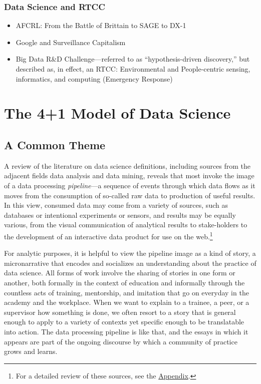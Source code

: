 \documentclass[
  letterpaper,
]{report}
\providecommand{\tightlist}{%
  \setlength{\itemsep}{0pt}\setlength{\parskip}{0pt}}\usepackage{longtable,booktabs,array}
\begin{document}
\hypertarget{data-science-and-rtcc}{%
\section{Data Science and RTCC}\label{data-science-and-rtcc}}

\begin{itemize}
\tightlist
\item
  AFCRL: From the Battle of Brittain to SAGE to DX-1
\item
  Google and Surveillance Capitalism
\item
  Big Data R\&D Challenge---referred to as ``hypothesis-driven
  discovery,'' but described as, in effect, an RTCC: Environmental and
  People-centric sensing, informatics, and computing (Emergency
  Response)
\end{itemize}

\part{The 4+1 Model of Data Science}

\hypertarget{a-common-theme}{%
\chapter{A Common Theme}\label{a-common-theme}}

A review of the literature on data science definitions, including
sources from the adjacent fields data analysis and data mining, reveals
that most invoke the image of a data processing \emph{pipeline}---a
sequence of events through which data flows as it moves from the
consumption of so-called raw data to production of useful results. In
this view, consumed data may come from a variety of sources, such as
databases or intentional experiments or sensors, and results may be
equally various, from the visual communication of analytical results to
stake-holders to the development of an interactive data product for use
on the web.\footnote{For a detailed review of these sources, see the
  \href{structure-sources.qmd}{Appendix}.}

For analytic purposes, it is helpful to view the pipeline image as a
kind of story, a micronarrative that encodes and socializes an
understanding about the practice of data science. All forms of work
involve the sharing of stories in one form or another, both formally in
the context of education and informally through the countless acts of
training, mentorship, and imitation that go on everyday in the academy
and the workplace. When we want to explain to a trainee, a peer, or a
supervisor how something is done, we often resort to a story that is
general enough to apply to a variety of contexts yet specific enough to
be translatable into action. The data processing pipeline is like that,
and the essays in which it appears are part of the ongoing discourse by
which a community of practice grows and learns.
\end{document}
